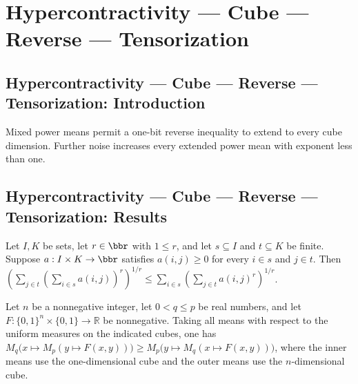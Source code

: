 \section{Hypercontractivity --- Cube --- Reverse --- Tensorization}
\subsection*{Hypercontractivity --- Cube --- Reverse --- Tensorization: Introduction}
Mixed power means permit a one-bit reverse inequality to extend to every cube dimension. Further noise increases every extended power mean with exponent less than one.

\subsection*{Hypercontractivity --- Cube --- Reverse --- Tensorization: Results}

\begin{lemma}
\leanok
{}
Let $I,K$ be sets, let $r\in\bbr$ with $1\le r$, and let $s\subseteq I$ and $t\subseteq
K$ be finite. Suppose $a:I\times K\to\bbr$ satisfies $a(i,j)\ge0$ for every $i\in s$ and
$j\in t$. Then $\displaystyle\left(\sum_{j\in t}\left(\sum_{i\in
s}a(i,j)\right)^r\right)^{1/r}\le\sum_{i\in s}\left(\sum_{j\in t}a(i,j)^r\right)^{1/r}$.
\end{lemma}

\begin{lemma}
\leanok
{}
Let $n$ be a nonnegative integer, let $0<q\le p$ be real numbers, and let
$F:\{0,1\}^n\times\{0,1\}\to\mathbb R$ be nonnegative. Taking all means with respect to
the uniform measures on the indicated cubes, one has $M_q\bigl(x\mapsto M_p(y\mapsto
F(x,y))\bigr)\ge M_p\bigl(y\mapsto M_q(x\mapsto F(x,y))\bigr)$, where the inner means
use the one-dimensional cube and the outer means use the $n$-dimensional cube.
\end{lemma}

